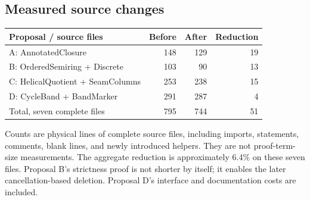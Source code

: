 \subsection{Measured source changes}
\begin{center}
\begin{tabular}{lrrr}
\toprule
Proposal / source files & Before & After & Reduction\\
\midrule
A: AnnotatedClosure & 148 & 129 & 19\\
B: OrderedSemiring + Discrete & 103 & 90 & 13\\
C: HelicalQuotient + SeamColumns & 253 & 238 & 15\\
D: CycleBand + BandMarker & 291 & 287 & 4\\
\midrule
Total, seven complete files & 795 & 744 & 51\\
\bottomrule
\end{tabular}
\end{center}
Counts are physical lines of complete source files, including imports, statements, comments, blank lines, and newly introduced helpers. They are not proof-term-size measurements. The aggregate reduction is approximately 6.4\% on these seven files. Proposal B's strictness proof is not shorter by itself; it enables the later cancellation-based deletion. Proposal D's interface and documentation costs are included.
